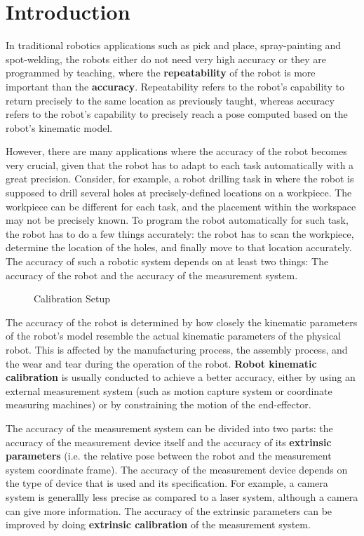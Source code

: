 \section{Introduction}
\label{sec:introduction}

In traditional robotics applications such as pick and place, spray-painting and spot-welding, the robots either do not need very high accuracy or they are programmed by teaching, where the \textbf{repeatability} of the robot is more important than the \textbf{accuracy}. Repeatability refers to the robot's capability to return precisely to the same location as previously taught, whereas accuracy refers to the robot's capability to precisely reach a pose computed based on the robot's kinematic model. 

However, there are many applications where the accuracy of the robot becomes very crucial, given that the robot has to adapt to each task automatically with a great precision. Consider, for example, a robot drilling task in \cite{Suarez-Ruiz2018} where the robot is supposed to drill several holes at precisely-defined locations on a workpiece. The workpiece can be different for each task, and the placement within the workspace may not be precisely known. To program the robot automatically for such task, the robot has to do a few things accurately: the robot has to scan the workpiece, determine the location of the holes, and finally move to that location accurately. The accuracy of such a robotic system depends on at least two things: The accuracy of the robot and the accuracy of the measurement system. 
\begin{figure}[t]
  \centering
  \caption{Calibration Setup}
  \label{fig:robot_setup}
\end{figure}

The accuracy of the robot is determined by how closely the kinematic parameters of the robot's model resemble the actual kinematic parameters of the physical robot. This is affected by the manufacturing process, the assembly process, and the wear and tear during the operation of the robot. \textbf{Robot kinematic calibration} is usually conducted to achieve a better accuracy, either by using an external measurement system (such as motion capture system or coordinate measuring machines) or by constraining the motion of the end-effector.

The accuracy of the measurement system can be divided into two parts: the accuracy of the measurement device itself and the accuracy of its \textbf{extrinsic parameters} (i.e. the relative pose between the robot and the measurement system coordinate frame). The accuracy of the measurement device depends on the type of device that is used and its specification. For example, a camera system is generallly less precise as compared to a laser system, although a camera can give more information. The accuracy of the extrinsic parameters can be improved by doing \textbf{extrinsic calibration} of the measurement system.  

